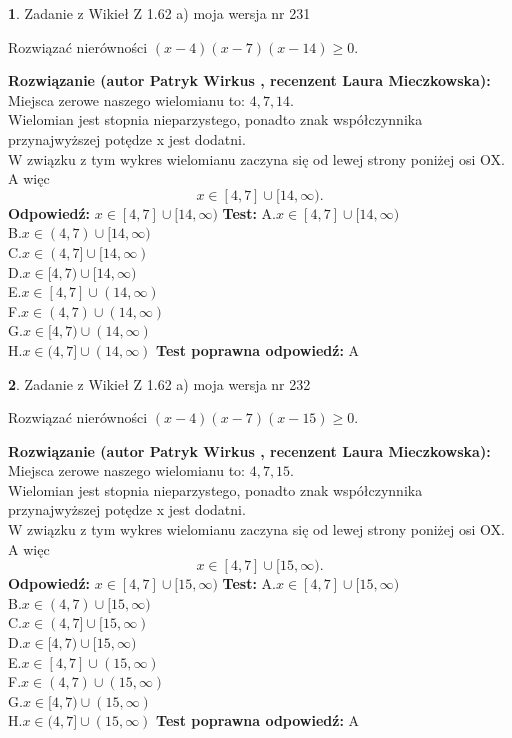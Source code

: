 \documentclass[12pt, a4paper]{article}
\theoremstyle{definition} %
\newtheorem{zad}{}
\newcommand{\zadStart}[1]{\begin{zad}#1\newline}
\newcommand{\zadStop}{\end{zad}}
\newcommand{\rozwStart}[2]{\noindent \textbf{Rozwiązanie (autor #1 , recenzent #2): }\newline}
\newcommand{\rozwStop}{\newline}
\newcommand{\odpStart}{\noindent \textbf{Odpowiedź:}\newline}
\newcommand{\odpStop}{\newline}
\newcommand{\testStart}{\noindent \textbf{Test:}\newline}
\newcommand{\testStop}{\newline}
\newcommand{\kluczStart}{\noindent \textbf{Test poprawna odpowiedź:}\newline}
\newcommand{\kluczStop}{\newline}
\begin{document}
\zadStart{Zadanie z Wikieł Z 1.62 a) moja wersja nr 231}

Rozwiązać nierówności $(x-4)(x-7)(x-14)\ge0$.
\zadStop
\rozwStart{Patryk Wirkus}{Laura Mieczkowska}
Miejsca zerowe naszego wielomianu to: $4, 7, 14$.\\
Wielomian jest stopnia nieparzystego, ponadto znak współczynnika przy\linebreak najwyższej potędze x jest dodatni.\\ W związku z tym wykres wielomianu zaczyna się od lewej strony poniżej osi OX. A więc $$x \in [4,7] \cup [14,\infty).$$
\rozwStop
\odpStart
$x \in [4,7] \cup [14,\infty)$
\odpStop
\testStart
A.$x \in [4,7] \cup [14,\infty)$\\
B.$x \in (4,7) \cup [14,\infty)$\\
C.$x \in (4,7] \cup [14,\infty)$\\
D.$x \in [4,7) \cup [14,\infty)$\\
E.$x \in [4,7] \cup (14,\infty)$\\
F.$x \in (4,7) \cup (14,\infty)$\\
G.$x \in [4,7) \cup (14,\infty)$\\
H.$x \in (4,7] \cup (14,\infty)$
\testStop
\kluczStart
A
\kluczStop



\zadStart{Zadanie z Wikieł Z 1.62 a) moja wersja nr 232}

Rozwiązać nierówności $(x-4)(x-7)(x-15)\ge0$.
\zadStop
\rozwStart{Patryk Wirkus}{Laura Mieczkowska}
Miejsca zerowe naszego wielomianu to: $4, 7, 15$.\\
Wielomian jest stopnia nieparzystego, ponadto znak współczynnika przy\linebreak najwyższej potędze x jest dodatni.\\ W związku z tym wykres wielomianu zaczyna się od lewej strony poniżej osi OX. A więc $$x \in [4,7] \cup [15,\infty).$$
\rozwStop
\odpStart
$x \in [4,7] \cup [15,\infty)$
\odpStop
\testStart
A.$x \in [4,7] \cup [15,\infty)$\\
B.$x \in (4,7) \cup [15,\infty)$\\
C.$x \in (4,7] \cup [15,\infty)$\\
D.$x \in [4,7) \cup [15,\infty)$\\
E.$x \in [4,7] \cup (15,\infty)$\\
F.$x \in (4,7) \cup (15,\infty)$\\
G.$x \in [4,7) \cup (15,\infty)$\\
H.$x \in (4,7] \cup (15,\infty)$
\testStop
\kluczStart
A
\kluczStop
\end{document}
